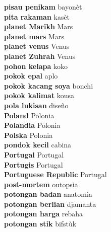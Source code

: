 \textbf{ pisau penikam  } bayonèt \\
\textbf{ pita rakaman  } kasèt \\
\textbf{ planet Marikh  } Mars \\
\textbf{ planet mars  } Mars \\
\textbf{ planet venus  } Venus \\
\textbf{ planet Zuhrah  } Venus \\
\textbf{ pohon kelapa  } koko \\
\textbf{ pokok epal  } aplo \\
\textbf{ pokok kacang soya  } bonchi \\
\textbf{ pokok kalimat  } kousa \\
\textbf{ pola lukisan  } diseño \\
\textbf{ Poland  } Polonia \\
\textbf{ Polandia  } Polonia \\
\textbf{ Polska  } Polonia \\
\textbf{ pondok kecil  } cabina \\
\textbf{ Portugal  } Portugal \\
\textbf{ Portugis  } Portugal \\
\textbf{ Portuguese Republic  } Portugal \\
\textbf{ post-mortem  } outopsia \\
\textbf{ potongan badan  } anatomia \\
\textbf{ potongan berlian  } djamanta \\
\textbf{ potongan harga  } rebaha \\
\textbf{ potongan stik  } bifstùk \\
